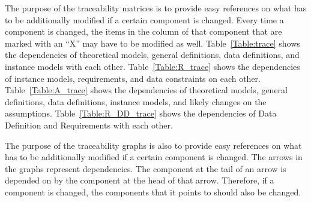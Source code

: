 \documentclass[12pt]{article}
\begin{document}
The purpose of the traceability matrices is to provide easy references on what
has to be additionally modified if a certain component is changed.  Every time a
component is changed, the items in the column of that component that are marked
with an ``X'' may have to be modified as well.  Table~\ref{Table:trace} shows the
dependencies of theoretical models, general definitions, data definitions, and
instance models with each other. Table~\ref{Table:R_trace} shows the
dependencies of instance models, requirements, and data constraints on each
other. Table~\ref{Table:A_trace} shows the dependencies of theoretical models,
general definitions, data definitions, instance models, and likely changes on
the assumptions. Table~\ref{Table:R_DD_trace} shows the dependencies of Data
Definition and Requirements with each other.

The purpose of the traceability graphs is also to provide easy references on
what has to be additionally modified if a certain component is changed.  The
arrows in the graphs represent dependencies. The component at the tail of an
arrow is depended on by the component at the head of that arrow. Therefore, if a
component is changed, the components that it points to should also be
changed. 


\end{document}
